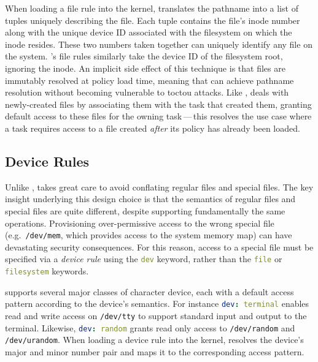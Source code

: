 When loading a file rule into the kernel, \bpfcontain{} translates the pathname into
a list of tuples uniquely describing the file. Each tuple contains the file's inode number
along with the unique device ID associated with the filesystem on which the inode resides.
These two numbers taken together can uniquely identify any file on the system.
\bpfcontain{}'s file rules similarly take the device ID of the filesystem root, ignoring
the inode. An implicit side effect of this technique is that files are immutably resolved
at policy load time, meaning that \bpfcontain{} can achieve pathname resolution without
becoming vulnerable to \gls{toctou} attacks. Like \bpfbox{}, \bpfcontain{} deals with
newly-created files by associating them with the task that created them, granting default
access to these files for the owning task\,---\,this resolves the use case where a task
requires access to a file created \textit{after} its policy has already been loaded.

\subsection{Device Rules}

Unlike \bpfbox{}, \bpfcontain{} takes great care to avoid conflating regular files and
special files. The key insight underlying this design choice is that the semantics of
regular files and special files are quite different, despite supporting fundamentally the
same operations. Provisioning over-permissive access to the wrong special file
(e.g.\ \texttt{/dev/mem}, which provides access to the system memory map) can have
devastating security consequences. For this reason, access to a special file must be
specified via a \textit{device rule} using the \lstinline[language=yaml]|dev| keyword,
rather than the \lstinline[language=yaml]|file| or \lstinline[language=yaml]|filesystem|
keywords.

\bpfcontain{} supports several major classes of character device, each with a default
access pattern according to the device's semantics.  For instance
\lstinline[language=yaml]|dev: terminal| enables read and write access on
\texttt{/dev/tty} to support standard input and output to the terminal. Likewise,
\lstinline[language=yaml]|dev: random| grants read only access to \texttt{/dev/random} and
\texttt{/dev/urandom}. When loading a device rule into the kernel, \bpfcontain{} resolves
the device's major and minor number pair and maps it to the corresponding access pattern.

